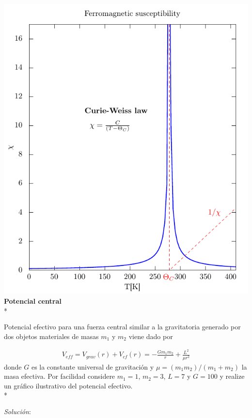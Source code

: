 \documentclass[11.5pt,a4paper]{article}
\begin{document}
\includegraphics[scale=0.60]{ejercicio1.pdf}\\

\textbf{Potencial central}\\*

Potencial efectivo para una fuerza central similar a la gravitatoria generado por dos objetos materiales de masas $m_1$ y $m_2$ viene dado por

\begin{eqnarray*}
V_{eff} = V_{grav}(r)+V_{cf}(r)=-\frac{G m_1 m_2}{r}+\frac{L^2}{\mu r^2}
\end{eqnarray*}
donde $G$ es la constante universal de gravitación y $\mu = (m_1 m_2)/(m_1+m_2)$ la masa efectiva. Por facilidad considere $m_1=1$, $m_2=3$, $L=7$ y $G=100$ y realize un gráfico ilustrativo del potencial efectivo.\\*

\textit{Solución}:
\end{document}
